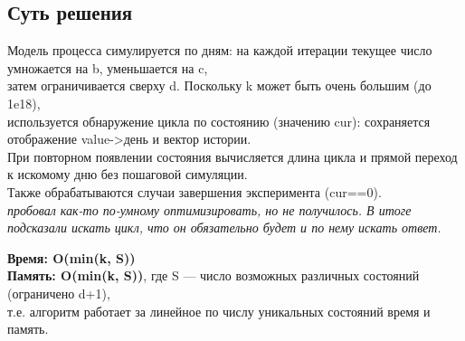 \documentclass[a4paper,12pt]{article}
\begin{document}
    \subsection*{Суть решения}
    Модель процесса симулируется по дням: на каждой итерации текущее число умножается на b, уменьшается на c,\\
    затем ограничивается сверху d. Поскольку k может быть очень большим (до 1e18), \\
    используется обнаружение цикла по состоянию (значению cur): сохраняется отображение value->день и вектор истории.\\
    При повторном появлении состояния вычисляется длина цикла и прямой переход к искомому дню без пошаговой симуляции.\\
    Также обрабатываются случаи завершения эксперимента (cur==0).
    \\

    \textit{пробовал как-то по-умному оптимизировать, но не получилось. В итоге подсказали искать цикл, что он обязательно будет и по нему искать ответ.}


    \textbf{Время: O(min(k, S))} \\
    \textbf{Память: O(min(k, S))}, где S — число возможных различных состояний (ограничено d+1), \\
    т.е. алгоритм работает за линейное по числу уникальных состояний время и память.
\end{document}
